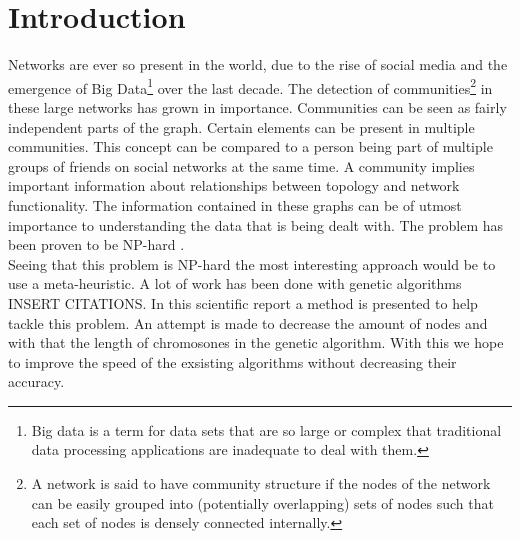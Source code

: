 \section{Introduction}\label{sec:introduction}

Networks are ever so present in the world, due to the rise of social media and the emergence of Big Data\footnote{Big data is a term for data sets that are so large or complex that traditional data processing applications are inadequate to deal with them.} over the last decade.
The detection of communities\footnote{A network is said to have community structure if the nodes of the network can be easily grouped into (potentially overlapping) sets of nodes such that each set of nodes is densely connected internally.} in these large networks has grown in importance.
Communities can be seen as fairly independent parts of the graph.
Certain elements can be present in multiple communities.
This concept can be compared to a person being part of multiple groups of friends on social networks at the same time.
A community implies important information about relationships between topology and network functionality.
The information contained in these graphs can be of utmost importance to understanding the data that is being dealt with.
The problem has been proven to be NP-hard \cite{Fortunato2010}.\\

Seeing that this problem is NP-hard the most interesting approach would be to use a meta-heuristic.
A lot of work has been done with genetic algorithms INSERT CITATIONS.
In this scientific report a method is presented to help tackle this problem.
An attempt is made to decrease the amount of nodes and with that the length of chromosones in the genetic algorithm.
With this we hope to improve the speed of the exsisting algorithms without decreasing their accuracy.
